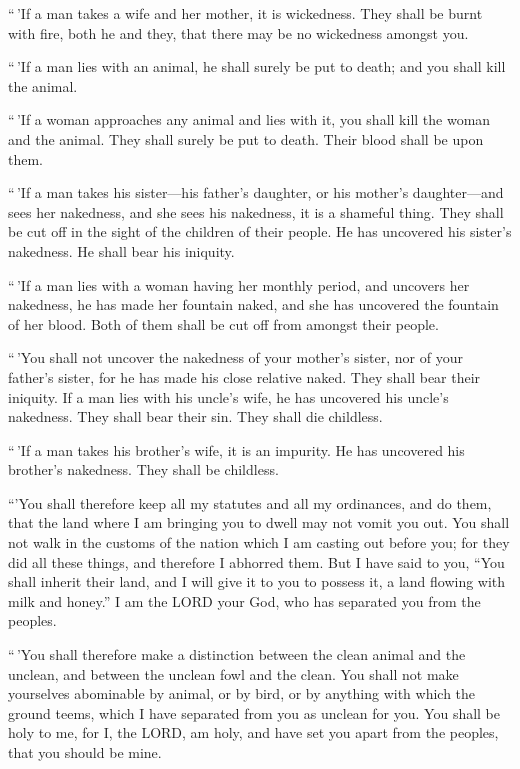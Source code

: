  ``\,'If a man takes a wife and her mother, it is
wickedness. They shall be burnt with fire, both he and they, that there
may be no wickedness amongst you.

 ``\,'If a man lies with an animal, he shall surely be
put to death; and you shall kill the animal.

 ``\,'If a woman approaches any animal and lies with it,
you shall kill the woman and the animal. They shall surely be put to
death. Their blood shall be upon them.

 ``\,'If a man takes his sister---his father's daughter,
or his mother's daughter---and sees her nakedness, and she sees his
nakedness, it is a shameful thing. They shall be cut off in the sight of
the children of their people. He has uncovered his sister's nakedness.
He shall bear his iniquity.

 ``\,'If a man lies with a woman having her monthly
period, and uncovers her nakedness, he has made her fountain naked, and
she has uncovered the fountain of her blood. Both of them shall be cut
off from amongst their people.

 ``\,'You shall not uncover the nakedness of your
mother's sister, nor of your father's sister, for he has made his close
relative naked. They shall bear their iniquity.  If a man
lies with his uncle's wife, he has uncovered his uncle's nakedness. They
shall bear their sin. They shall die childless.

 ``\,'If a man takes his brother's wife, it is an
impurity. He has uncovered his brother's nakedness. They shall be
childless.

 ``'You shall therefore keep all my statutes and all my
ordinances, and do them, that the land where I am bringing you to dwell
may not vomit you out.  You shall not walk in the customs
of the nation which I am casting out before you; for they did all these
things, and therefore I abhorred them.  But I have said
to you, ``You shall inherit their land, and I will give it to you to
possess it, a land flowing with milk and honey.'' I am the LORD your
God, who has separated you from the peoples.

 ``\,'You shall therefore make a distinction between the
clean animal and the unclean, and between the unclean fowl and the
clean. You shall not make yourselves abominable by animal, or by bird,
or by anything with which the ground teems, which I have separated from
you as unclean for you.  You shall be holy to me, for I,
the LORD, am holy, and have set you apart from the peoples, that you
should be mine.

